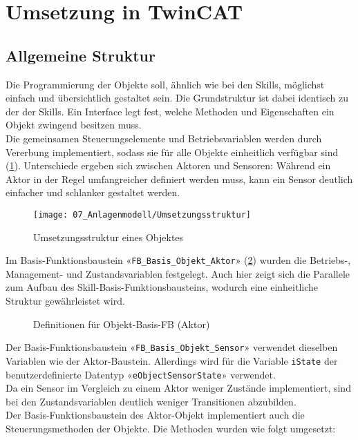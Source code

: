 \section{Umsetzung in TwinCAT} \label{Objektumsetzung in TwinCAT}
	\subsection{Allgemeine Struktur} \label{Objekt_Allgemeine Struktur}
		Die Programmierung der Objekte soll, ähnlich wie bei den Skills, möglichst einfach und übersichtlich gestaltet sein. Die Grundstruktur ist dabei identisch zu der der Skills. Ein Interface legt fest, welche Methoden und Eigenschaften ein Objekt zwingend besitzen muss.
		\\
		Die gemeinsamen Steuerungselemente und Betriebsvariablen werden durch Vererbung implementiert, sodass sie für alle Objekte einheitlich verfügbar sind (\ref{fig:Umsetzungsstruktur}). Unterschiede ergeben sich zwischen Aktoren und Sensoren: Während ein Aktor in der Regel umfangreicher definiert werden muss, kann ein Sensor deutlich einfacher und schlanker gestaltet werden.
		\\
		\begin{figure}[h!]
			\centering
			\texttt{[image: 07\_Anlagenmodell/Umsetzungsstruktur]}
			\captionsetup{justification=centering}
			\caption{Umsetzungsstruktur eines Objektes}
			\label{fig:Umsetzungsstruktur}
		\end{figure}
		
		\newpage
		
		Im Basis-Funktionsbaustein «\verb|FB_Basis_Objekt_Aktor|» (\ref{fig:FB_Basis_Objekt}) wurden die Betriebs-, Management- und Zustandsvariablen festgelegt. Auch hier zeigt sich die Parallele zum Aufbau des Skill-Basis-Funktionsbausteins, wodurch eine einheitliche Struktur gewährleistet wird.
		
		\begin{figure}[h!]
			\centering
			\captionsetup{justification=centering}
			\caption{Definitionen für Objekt-Basis-FB (Aktor)}
			\label{fig:FB_Basis_Objekt}
		\end{figure}
		
		Der Basis-Funktionsbaustein «\verb|FB_Basis_Objekt_Sensor|» verwendet dieselben Variablen wie der Aktor-Baustein. Allerdings wird für die Variable \verb|iState| der benutzerdefinierte Datentyp «\verb|eObjectSensorState|» verwendet. 
		\\
		Da ein Sensor im Vergleich zu einem Aktor weniger Zustände implementiert, sind bei den Zustandsvariablen deutlich weniger Transitionen abzubilden.
		\\
		Der Basis-Funktionsbaustein des Aktor-Objekt implementiert auch die Steuerungsmethoden der Objekte. Die Methoden wurden wie folgt umgesetzt:
		
